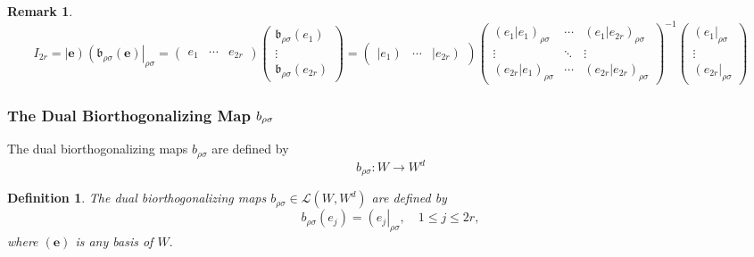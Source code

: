 \documentclass[aps,preprint]{revtex4}
\newtheorem{definition}[theorem]{Definition}
\newtheorem{remark}[theorem]{Remark}
\begin{document}
\begin{remark}
\begin{equation}
I_{2r}=\left\vert \boldsymbol{e}\right) \left( \mathfrak{b}_{\rho \sigma
}\left( \boldsymbol{e}\right) \right\vert _{\rho \sigma }=\left( 
\begin{array}{ccc}
e_{1} & \cdots & e_{2r}%
\end{array}%
\right) \left( 
\begin{array}{c}
\mathfrak{b}_{\rho \sigma }\left( e_{1}\right) \\ 
\vdots \\ 
\mathfrak{b}_{\rho \sigma }\left( e_{2r}\right)%
\end{array}%
\right) =\left( 
\begin{array}{ccc}
\left\vert e_{1}\right) & \cdots & \left\vert e_{2r}\right)%
\end{array}%
\right) \left( 
\begin{array}{ccc}
\left( \left. e_{1}\right\vert e_{1}\right) _{\rho \sigma } & \cdots & 
\left( \left. e_{1}\right\vert e_{2r}\right) _{\rho \sigma } \\ 
\vdots & \ddots & \vdots \\ 
\left( \left. e_{2r}\right\vert e_{1}\right) _{\rho \sigma } & \cdots & 
\left( \left. e_{2r}\right\vert e_{2r}\right) _{\rho \sigma }%
\end{array}%
\right) ^{-1}\left( 
\begin{array}{c}
\left( e_{1}\right\vert _{\rho \sigma } \\ 
\vdots \\ 
\left( e_{2r}\right\vert _{\rho \sigma }%
\end{array}%
\right)
\end{equation}
\end{remark}

\subsubsection{\textbf{The Dual Biorthogonalizing Map }$b_{\protect\rho 
\protect\sigma }$ \label{The Dual Biorthogonalizing Map} \label{1/15/2026}}

The dual biorthogonalizing maps $b_{\rho \sigma }$ are defined by 
\begin{equation}
b_{\rho \sigma }:W\rightarrow W^{d}
\end{equation}

\begin{definition}
The dual biorthogonalizing maps $b_{\rho \sigma }\in \mathcal{L}\left(
W,W^{d}\right) $ are defined by 
\begin{equation}
b_{\rho \sigma }\left( e_{j}\right) =\left( e_{j}\right\vert _{\rho \sigma
},\quad 1\leq j\leq 2r,
\end{equation}%
where $\left( \mathbf{e}\right) $ is any basis of $W.$
\end{definition}
\end{document}
